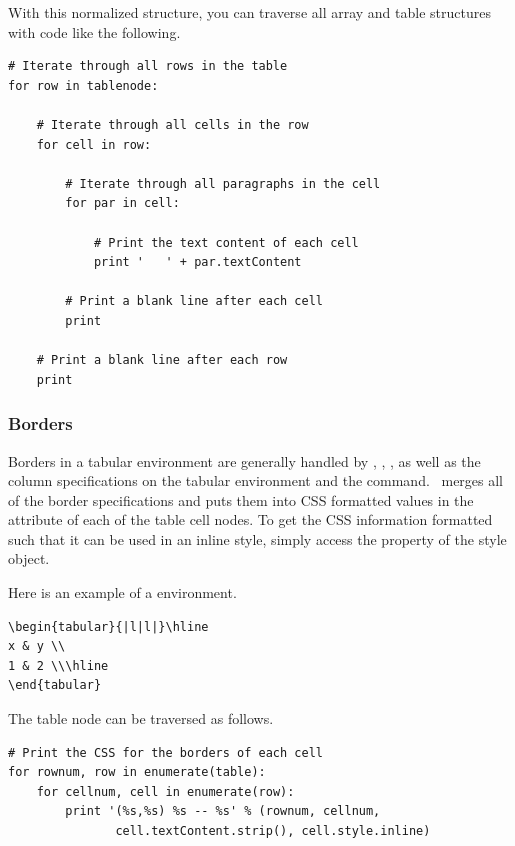 With this normalized structure, you can traverse all array and table 
structures with code like the following.
\begin{verbatim}
# Iterate through all rows in the table
for row in tablenode:

    # Iterate through all cells in the row
    for cell in row:

        # Iterate through all paragraphs in the cell
        for par in cell:

            # Print the text content of each cell
            print '   ' + par.textContent 

        # Print a blank line after each cell
        print

    # Print a blank line after each row
    print
\end{verbatim}


\subsubsection{Borders}

Borders in a tabular environment are generally handled by ,
, , as well as the column specifications on 
the tabular environment and the  command.  
\plasTeX\ merges all of the border specifications and puts them into 
CSS formatted values in the  attribute of each of the 
table cell nodes.  To get the CSS information formatted such that it
can be used in an inline style, simply access the  property
of the style object. 

Here is an example of a  environment.
\begin{verbatim}
\begin{tabular}{|l|l|}\hline
x & y \\
1 & 2 \\\hline
\end{tabular}
\end{verbatim}

The table node can be traversed as follows.
\begin{verbatim}
# Print the CSS for the borders of each cell
for rownum, row in enumerate(table):
    for cellnum, cell in enumerate(row):
        print '(%s,%s) %s -- %s' % (rownum, cellnum, 
               cell.textContent.strip(), cell.style.inline)
\end{verbatim}

